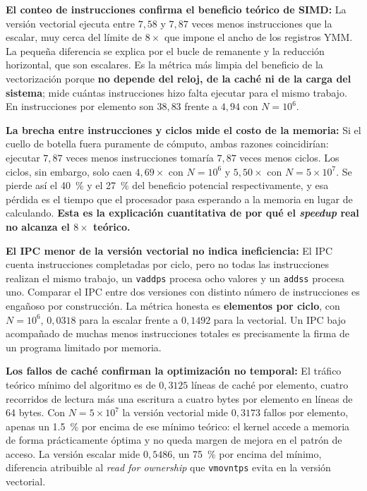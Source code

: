 \documentclass[journal]{IEEEtran}
\begin{document}
\textbf{El conteo de instrucciones confirma el beneficio teórico de
SIMD:} La versión vectorial ejecuta entre $7,58$ y $7,87$ veces
menos instrucciones que la escalar, muy cerca del límite de $8\times$
que impone el ancho de los registros YMM. La pequeña diferencia se
explica por el bucle de remanente y la reducción horizontal, que son
escalares. Es la métrica más limpia del beneficio de la vectorización
porque \textbf{no depende del reloj, de la caché ni de la carga del
sistema}; mide cuántas instrucciones hizo falta ejecutar para el mismo
trabajo. En instrucciones por elemento son $38,83$ frente a $4,94$ con
$N = 10^6$.

\textbf{La brecha entre instrucciones y ciclos mide el costo de la
memoria:} Si el cuello de botella fuera puramente de cómputo, ambas
razones coincidirían: ejecutar $7,87$ veces menos instrucciones
tomaría $7,87$ veces menos ciclos. Los ciclos, sin embargo, solo caen
$4,69\times$ con $N = 10^6$ y $5,50\times$ con $N = 5\times10^7$. Se
pierde así el \SI{40}{\percent} y el \SI{27}{\percent} del beneficio potencial respectivamente,
y esa pérdida es el tiempo que el procesador pasa esperando a la memoria
en lugar de calculando. \textbf{Esta es la explicación cuantitativa de
por qué el \textit{speedup} real no alcanza el $8\times$ teórico.}

\textbf{El IPC menor de la versión vectorial no indica ineficiencia:} El
IPC cuenta instrucciones completadas por ciclo, pero no todas las
instrucciones realizan el mismo trabajo, un \texttt{vaddps} procesa ocho
valores y un \texttt{addss} procesa uno. Comparar el IPC entre dos
versiones con distinto número de instrucciones es engañoso por
construcción. La métrica honesta es \textbf{elementos por ciclo}, con
$N = 10^6$, $0,0318$ para la escalar frente a $0,1492$ para la
vectorial. Un IPC bajo acompañado de muchas menos instrucciones totales
es precisamente la firma de un programa limitado por memoria.

\textbf{Los fallos de caché confirman la optimización no temporal:} El
tráfico teórico mínimo del algoritmo es de $0,3125$ líneas de
caché por elemento, cuatro recorridos de lectura más una escritura a
cuatro bytes por elemento en líneas de 64 bytes. Con
$N = 5\times10^7$ la versión vectorial mide $0,3173$ fallos por
elemento, apenas un \SI{1,5}{\percent} por encima de ese mínimo teórico: el
kernel accede a memoria de forma prácticamente óptima y no queda margen
de mejora en el patrón de acceso. La versión escalar mide $0,5486$,
un \SI{75}{\percent} por encima del mínimo, diferencia atribuible al \textit{read
for ownership} que \texttt{vmovntps} evita en la versión vectorial.
\end{document}
